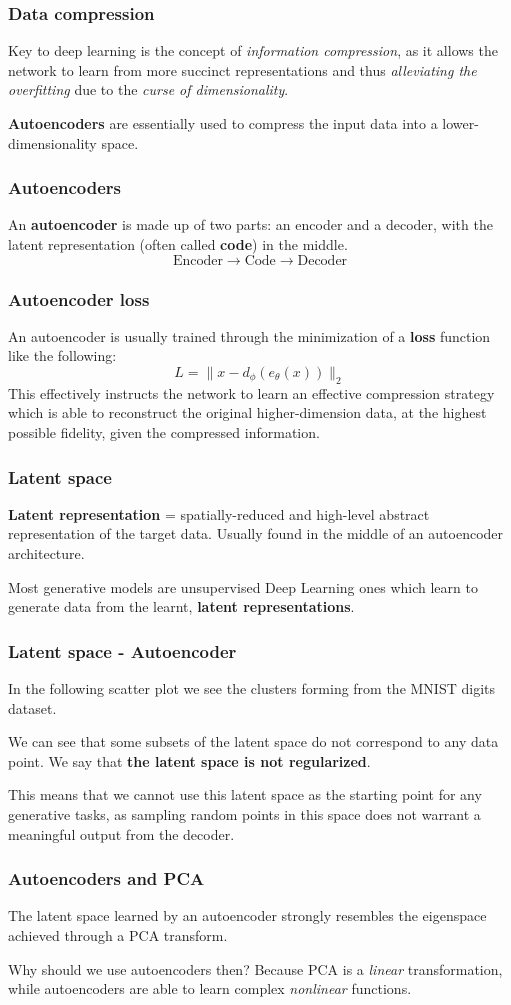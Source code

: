 \begin{frame}
    \frametitle{Data compression}
    Key to deep learning is the concept of \emph{information compression}, as it allows the network to learn from more succinct representations and thus \emph{alleviating the overfitting} due to the \emph{curse of dimensionality}.

    \textbf{Autoencoders} are essentially used to compress the input data into a lower-dimensionality space.
\end{frame}

\begin{frame}
    \frametitle{Autoencoders}
    An \textbf{autoencoder} is made up of two parts: an encoder and a decoder, with the latent representation (often called \textbf{code}) in the middle.
    $$\text{Encoder} \to \text{Code} \to \text{Decoder}$$
\end{frame}

\begin{frame}
    \frametitle{Autoencoder loss}
    An autoencoder is usually trained through the minimization of a \textbf{loss} function like the following:
    $$L=\lVert x - d_\phi(e_\theta(x)) \rVert_2$$
    This effectively instructs the network to learn an effective compression strategy which is able to reconstruct the original higher-dimension data, at the highest possible fidelity, given the compressed information.
\end{frame}

\begin{frame}
    \frametitle{Latent space}
    \textbf{Latent representation} = spatially-reduced and high-level abstract representation of the target data. Usually found in the middle of an autoencoder architecture.

    Most generative models are unsupervised Deep Learning ones which learn to generate data from the learnt, \textbf{latent representations}.
\end{frame}

\begin{frame}
    \frametitle{Latent space - Autoencoder}
    In the following scatter plot we see the clusters forming from the MNIST digits dataset.

    We can see that some subsets of the latent space do not correspond to any data point. We say that \textbf{the latent space is not regularized}.

    This means that we cannot use this latent space as the starting point for any generative tasks, as sampling random points in this space does not warrant a meaningful output from the decoder.
\end{frame}

\begin{frame}
    \frametitle{Autoencoders and PCA}
    The latent space learned by an autoencoder strongly resembles the eigenspace achieved through a PCA transform.

    Why should we use autoencoders then? Because PCA is a \emph{linear} transformation, while autoencoders are able to learn complex \emph{nonlinear} functions.
\end{frame}